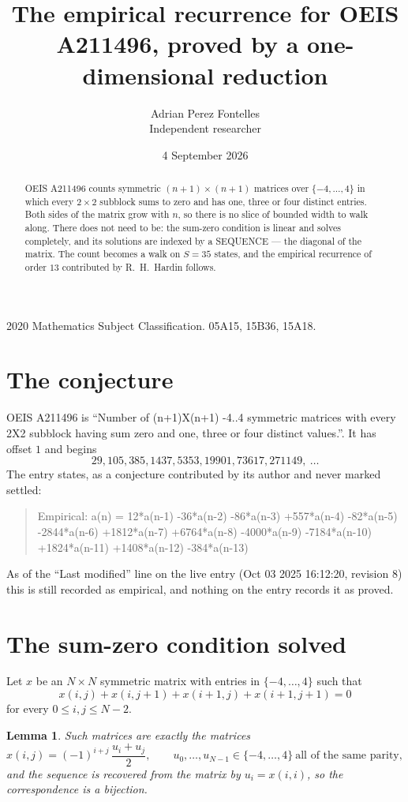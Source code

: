 \documentclass[11pt,a4paper]{article}
\title{The empirical recurrence for OEIS A211496, proved by a one-dimensional reduction}
\author{Adrian Perez Fontelles\\ \small Independent researcher}
\date{4 September 2026}
\theoremstyle{plain}
\newtheorem{lemma}[theorem]{Lemma}
\theoremstyle{definition}
\begin{document}
\maketitle

\begin{abstract}
OEIS A211496 counts symmetric $(n+1)\times(n+1)$ matrices over
$\{-4,\dots,4\}$ in which every $2\times2$ subblock sums to zero and has one, three or four distinct
entries. Both sides of the matrix grow with $n$, so there is no slice of bounded width to walk
along. There does not need to be: the sum-zero condition is linear and solves completely, and
its solutions are indexed by a SEQUENCE --- the diagonal of the matrix. The count becomes a walk
on $S=35$ states, and the empirical recurrence of order $13$ contributed by R.~H.~Hardin
follows.
\end{abstract}

\noindent\small 2020 Mathematics Subject Classification. 05A15, 15B36, 15A18.\normalsize

\section{The conjecture}

OEIS A211496 is ``Number of (n+1)X(n+1) -4..4 symmetric matrices with every 2X2 subblock having sum zero and one, three or four distinct values.''. It has offset $1$ and begins
\[
29, 105, 385, 1437, 5353, 19901, 73617, 271149,\ \dots
\]
The entry states, as a conjecture contributed by its author and never marked settled:
\begin{quote}
Empirical: a(n) = 12*a(n-1) -36*a(n-2) -86*a(n-3) +557*a(n-4) -82*a(n-5) -2844*a(n-6) +1812*a(n-7) +6764*a(n-8) -4000*a(n-9) -7184*a(n-10) +1824*a(n-11) +1408*a(n-12) -384*a(n-13)
\end{quote}
As of the ``Last modified'' line on the live entry (Oct 03 2025 16:12:20, revision 8) this is still
recorded as empirical, and nothing on the entry records it as proved.

\section{The sum-zero condition solved}

Let $x$ be an $N\times N$ symmetric matrix with entries in $\{-4,\dots,4\}$ such that
\[
x(i,j)+x(i,j{+}1)+x(i{+}1,j)+x(i{+}1,j{+}1)=0
\]
for every $0\le i,j\le N-2$.

\begin{lemma}\label{lem:solve}
Such matrices are exactly the matrices
\[
x(i,j)=(-1)^{i+j}\,\frac{u_i+u_j}{2},
\qquad u_0,\dots,u_{N-1}\in\{-4,\dots,4\}\ \text{all of the same parity},
\]
and the sequence is recovered from the matrix by $u_i=x(i,i)$, so the correspondence is a
bijection.
\end{lemma}
\end{document}
